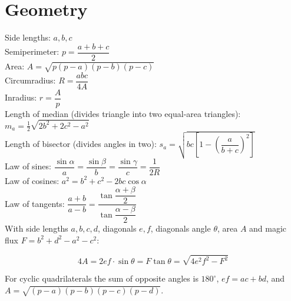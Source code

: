 \section{Geometry}

Side lengths: $a,b,c$\\
Semiperimeter: $p=\dfrac{a+b+c}{2}$\\
Area: $A=\sqrt{p(p-a)(p-b)(p-c)}$\\
Circumradius: $R=\dfrac{abc}{4A}$\\
Inradius: $r=\dfrac{A}{p}$\\
Length of median (divides triangle into two equal-area triangles): $m_a=\tfrac{1}{2}\sqrt{2b^2+2c^2-a^2}$\\
Length of bisector (divides angles in two): $s_a=\sqrt{bc\left[1-\left(\dfrac{a}{b+c}\right)^2\right]}$\\
Law of sines: $\dfrac{\sin\alpha}{a}=\dfrac{\sin\beta}{b}=\dfrac{\sin\gamma}{c}=\dfrac{1}{2R}$\\
Law of cosines: $a^2=b^2+c^2-2bc\cos\alpha$\\
Law of tangents: $\dfrac{a+b}{a-b}=\dfrac{\tan\dfrac{\alpha+\beta}{2}}{\tan\dfrac{\alpha-\beta}{2}}$\\

With side lengths $a,b,c,d$, diagonals $e, f$, diagonals angle $\theta$, area $A$ and
magic flux $F=b^2+d^2-a^2-c^2$:

\[ 4A = 2ef \cdot \sin\theta = F\tan\theta = \sqrt{4e^2f^2-F^2} \]

 For cyclic quadrilaterals the sum of opposite angles is $180^\circ$,
$ef = ac + bd$, and $A = \sqrt{(p-a)(p-b)(p-c)(p-d)}$.





